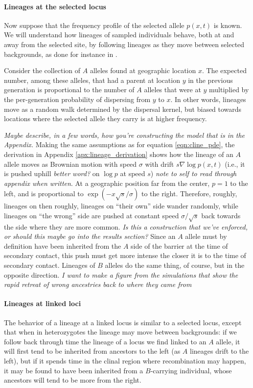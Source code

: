 \documentclass[11pt,letterpaper]{article}
\newcommand{\alisa}[1]{{\em \color{red} #1}}
\newcommand{\grad}{\nabla}
\begin{document}
\paragraph{Lineages at the selected locus}
Now suppose that the frequency profile of the selected allele $p(x,t)$ is known.
We will understand how lineages of sampled individuals behave,
both at and away from the selected site,
by following lineages as they move between selected backgrounds,
as done for instance in \citet{selectioncoal,Ralph2015}.


Consider the collection of $A$ alleles found at geographic location $x$.
The expected number, among these alleles, that had a parent at location $y$ in the previous generation is proportional to the number of  $A$ alleles that were at $y$ multiplied by the per-generation probability of dispersing from $y$ to $x$. In other words, lineages move as a random walk determined by the dispersal kernel,
but biased towards locations where the selected allele they carry is at higher frequency.

\alisa{Maybe describe, in a few words, how you're constructing the model that is in the Appendix.}
Making the same assumptions as for  equation \eqref{eqn:cline_pde}, the derivation in Appendix \ref{apx:lineage_derivation} shows 
how the lineage of an $A$ allele moves as Brownian motion with speed $\sigma$
with drift $s \grad \log p(x,t)$ (i.e., it is pushed uphill \alisa{better word?} on $\log p$ at speed $s$) \alisa{note to self to read through appendix when written}.
At a geographic position far from the center, $p=1$ to the left, and is proportional to  $\exp(-x\sqrt{s}/\sigma)$ to the right.
Therefore, roughly, lineages on 
then roughly, lineages on ``their own'' side wander randomly,
while lineages on ``the wrong'' side are pushed at constant speed $\sigma/\sqrt{s}$ 
back towards the side where they are more common. \alisa{Is this a construction that we've enforced, or should this maybe go into the results section?}
Since an $A$ allele must by definition have been inherited from the $A$ side of the barrier 
at the time of secondary contact, this push must get more intense the closer it is to the time of secondary contact.
Lineages of $B$ alleles do the same thing, of course, but in the opposite direction. \alisa{I want to make a figure from the simulations that show the rapid retreat of wrong ancestries back to where they came from}


\paragraph{Lineages at linked loci}
The behavior of a lineage at a linked locus is similar to a selected locus,
except that when in heterozygotes the lineage may move between backgrounds:
if we follow back through time the lineage of a locus we find linked to an $A$ allele, 
it will first tend to be inherited from ancestors to the left (as $A$ lineages drift to the left),
but if it spends time in the clinal region where recombination may happen,
it may be found to have been inherited from a $B$-carrying individual,
whose ancestors will tend to be more from the right.
\end{document}
